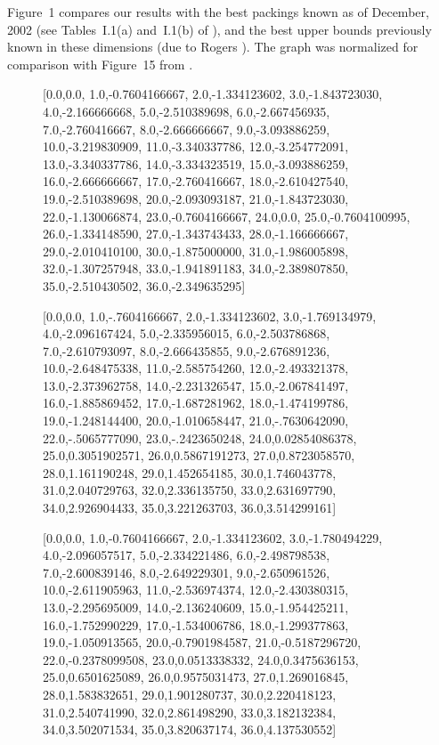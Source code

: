 Figure~1 compares our results with the best
packings known as of December, 2002 (see Tables~I.1(a)
and~I.1(b) of \cite[pp.~xix, xx]{CS}), and the best upper
bounds previously known in these dimensions (due to Rogers
\cite{Ro}). The graph was normalized for comparison with Figure~15
from \cite[p.~14]{CS}.
\begin{figure}
\begin{center}

\savedata{\bestknown}[{{0.0,0.0}, {1.0,-0.7604166667},
{2.0,-1.334123602}, {3.0,-1.843723030}, {4.0,-2.166666668},
{5.0,-2.510389698}, {6.0,-2.667456935}, {7.0,-2.760416667},
{8.0,-2.666666667}, {9.0,-3.093886259}, {10.0,-3.219830909},
{11.0,-3.340337786}, {12.0,-3.254772091}, {13.0,-3.340337786},
{14.0,-3.334323519}, {15.0,-3.093886259}, {16.0,-2.666666667},
{17.0,-2.760416667}, {18.0,-2.610427540}, {19.0,-2.510389698},
{20.0,-2.093093187}, {21.0,-1.843723030}, {22.0,-1.130066874},
{23.0,-0.7604166667}, {24.0,0.0}, {25.0,-0.7604100995},
{26.0,-1.334148590}, {27.0,-1.343743433}, {28.0,-1.166666667},
{29.0,-2.010410100}, {30.0,-1.875000000}, {31.0,-1.986005898},
{32.0,-1.307257948}, {33.0,-1.941891183}, {34.0,-2.389807850},
{35.0,-2.510430502}, {36.0,-2.349635295}}]

\savedata{\rogersbound}[{{0.0,0.0}, {1.0,-.7604166667},
{2.0,-1.334123602}, {3.0,-1.769134979}, {4.0,-2.096167424},
{5.0,-2.335956015}, {6.0,-2.503786868}, {7.0,-2.610793097},
{8.0,-2.666435855}, {9.0,-2.676891236}, {10.0,-2.648475338},
{11.0,-2.585754260}, {12.0,-2.493321378}, {13.0,-2.373962758},
{14.0,-2.231326547}, {15.0,-2.067841497}, {16.0,-1.885869452},
{17.0,-1.687281962}, {18.0,-1.474199786}, {19.0,-1.248144400},
{20.0,-1.010658447}, {21.0,-.7630642090}, {22.0,-.5065777090},
{23.0,-.2423650248}, {24.0,0.02854086378}, {25.0,0.3051902571},
{26.0,0.5867191273}, {27.0,0.8723058570}, {28.0,1.161190248},
{29.0,1.452654185}, {30.0,1.746043778}, {31.0,2.040729763},
{32.0,2.336135750}, {33.0,2.631697790}, {34.0,2.926904433},
{35.0,3.221263703}, {36.0,3.514299161}}]

\savedata{\newbound}[{{0.0,0.0}, {1.0,-0.7604166667},
{2.0,-1.334123602}, {3.0,-1.780494229}, {4.0,-2.096057517},
{5.0,-2.334221486}, {6.0,-2.498798538}, {7.0,-2.600839146},
{8.0,-2.649229301}, {9.0,-2.650961526}, {10.0,-2.611905963},
{11.0,-2.536974374}, {12.0,-2.430380315}, {13.0,-2.295695009},
{14.0,-2.136240609}, {15.0,-1.954425211}, {16.0,-1.752990229},
{17.0,-1.534006786}, {18.0,-1.299377863}, {19.0,-1.050913565},
{20.0,-0.7901984587}, {21.0,-0.5187296720}, {22.0,-0.2378099508},
{23.0,0.0513338332}, {24.0,0.3475636153}, {25.0,0.6501625089},
{26.0,0.9575031473}, {27.0,1.269016845}, {28.0,1.583832651},
{29.0,1.901280737}, {30.0,2.220418123}, {31.0,2.540741990},
{32.0,2.861498290}, {33.0,3.182132384}, {34.0,3.502071534},
{35.0,3.820637174}, {36.0,4.137530552}}]


\end{center}
\end{figure}
